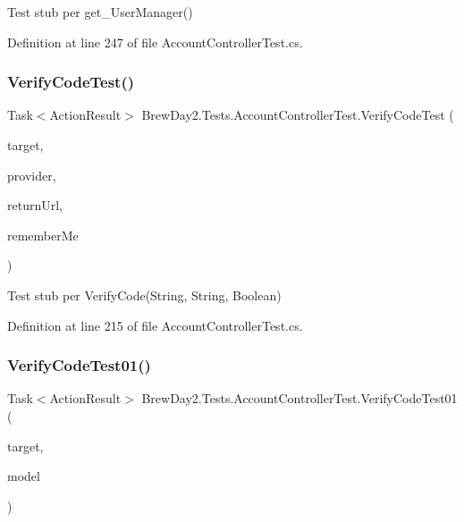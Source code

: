 Test stub per get\+\_\+\+User\+Manager()



Definition at line 247 of file Account\+Controller\+Test.\+cs.

\mbox{\label{class_brew_day2_1_1_tests_1_1_account_controller_test_a56bb44e29872292efb61d07e130e051a}} 
\subsubsection{\texorpdfstring{Verify\+Code\+Test()}{VerifyCodeTest()}}
{\footnotesize\ttfamily Task$<$Action\+Result$>$ Brew\+Day2.\+Tests.\+Account\+Controller\+Test.\+Verify\+Code\+Test (\begin{DoxyParamCaption}\item[{\mbox{[}\+Pex\+Assume\+Under\+Test\mbox{]} \mbox{\hyperlink{class_brew_day2_1_1_controllers_1_1_account_controller}{Account\+Controller}}}]{target,  }\item[{string}]{provider,  }\item[{string}]{return\+Url,  }\item[{bool}]{remember\+Me }\end{DoxyParamCaption})}



Test stub per Verify\+Code(\+String, String, Boolean)



Definition at line 215 of file Account\+Controller\+Test.\+cs.

\mbox{\label{class_brew_day2_1_1_tests_1_1_account_controller_test_a47948857ef4b3ee271de407ecc68e368}} 
\subsubsection{\texorpdfstring{Verify\+Code\+Test01()}{VerifyCodeTest01()}}
{\footnotesize\ttfamily Task$<$Action\+Result$>$ Brew\+Day2.\+Tests.\+Account\+Controller\+Test.\+Verify\+Code\+Test01 (\begin{DoxyParamCaption}\item[{\mbox{[}\+Pex\+Assume\+Under\+Test\mbox{]} \mbox{\hyperlink{class_brew_day2_1_1_controllers_1_1_account_controller}{Account\+Controller}}}]{target,  }\item[{\mbox{\hyperlink{class_brew_day2_1_1_models_1_1_verify_code_view_model}{Verify\+Code\+View\+Model}}}]{model }\end{DoxyParamCaption})}



